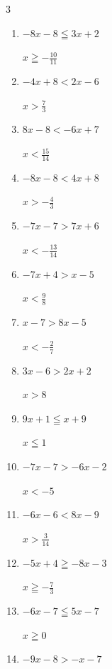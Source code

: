 \begin{multicols}{3}
\begin{enumerate}
        $\displaystyle x\geqq -17$

  \item $-8x-8\leqq 3x+2$

        $\displaystyle x\geqq -\frac{10}{11}$

  \item $-4x+8<2x-6$

        $\displaystyle x>\frac{7}{3}$

  \item $8x-8<-6x+7$

        $\displaystyle x<\frac{15}{14}$

  \item $-8x-8<4x+8$

        $\displaystyle x>-\frac{4}{3}$

  \item $-7x-7>7x+6$

        $\displaystyle x<-\frac{13}{14}$

  \item $-7x+4>x-5$

        $\displaystyle x<\frac{9}{8}$

  \item $x-7>8x-5$

        $\displaystyle x<-\frac{2}{7}$

  \item $3x-6>2x+2$

        $\displaystyle x>8$

  \item $9x+1\leqq x+9$

        $\displaystyle x\leqq 1$

  \item $-7x-7>-6x-2$

        $\displaystyle x<-5$

\columnbreak %

  \item $-6x-6<8x-9$

        $\displaystyle x>\frac{3}{14}$

  \item $-5x+4\geqq -8x-3$

        $\displaystyle x\geqq -\frac{7}{3}$

  \item $-6x-7\leqq 5x-7$

        $\displaystyle x\geqq 0$

  \item $-9x-8>-x-7$


\end{enumerate}
\end{multicols}
